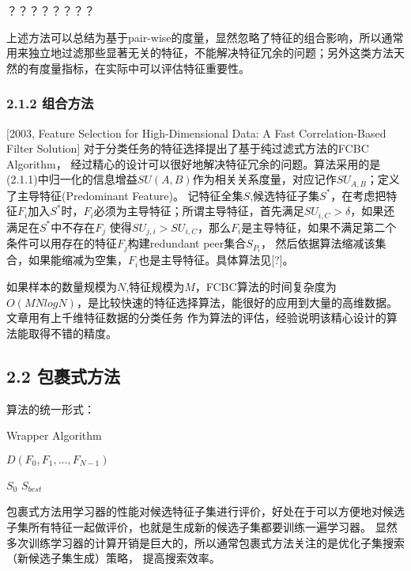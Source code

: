 \documentclass[a4paper,UTF8]{article}
\begin{document}
  ？？？？？？？？

  上述方法可以总结为基于pair-wise的度量，显然忽略了特征的组合影响，所以通常用来独立地过滤那些显著无关的特征，不能解决特征冗余的问题；另外这类方法天然的有度量指标，在实际中可以评估特征重要性。


\subsubsection*{2.1.2 组合方法}

[2003, Feature Selection for High-Dimensional Data: A Fast Correlation-Based Filter Solution] 对于分类任务的特征选择提出了基于纯过滤式方法的FCBC Algorithm，
经过精心的设计可以很好地解决特征冗余的问题。算法采用的是(2.1.1)中归一化的信息增益$SU(A,B)$作为相关关系度量，对应记作$SU_{A,B}$；定义了主导特征(Predominant Feature)。
记特征全集$S$,候选特征子集$S^{*}$，在考虑把特征$F_{i}$加入$S^{*}$时，$F_{i}$必须为主导特征；所谓主导特征，首先满足$SU_{i,C} > \delta$，如果还满足在$S^{*}$中不存在$F_{j}$
使得$SU_{j,i}>SU_{i,C}$，那么$F_{i}$是主导特征，如果不满足第二个条件可以用存在的特征$F_{j}$构建redundant peer集合$S_{P_{i}}$，
然后依据算法缩减该集合，如果能缩减为空集，$F_{i}$也是主导特征。具体算法见[?]。

如果样本的数量规模为$N$,特征规模为$M$，FCBC算法的时间复杂度为$O(MNlogN)$，是比较快速的特征选择算法，能很好的应用到大量的高维数据。文章用有上千维特征数据的分类任务
作为算法的评估，经验说明该精心设计的算法能取得不错的精度。






\subsection*{2.2 包裹式方法}
算法的统一形式：
\begin{algorithm}
  \caption{Wrapper Algorithm}
  \begin{algorithmic}
    \REQUIRE $ D(F_{0}, F_{1},..., F_{N-1})$

             $ S_{0}$
    \ENSURE $ S_{best} $

  \end{algorithmic}




\end{algorithm}

包裹式方法用学习器的性能对候选特征子集进行评价，好处在于可以方便地对候选子集所有特征一起做评价，也就是生成新的候选子集都要训练一遍学习器。
显然多次训练学习器的计算开销是巨大的，所以通常包裹式方法关注的是优化子集搜索（新候选子集生成）策略，
提高搜索效率。
\end{document}
